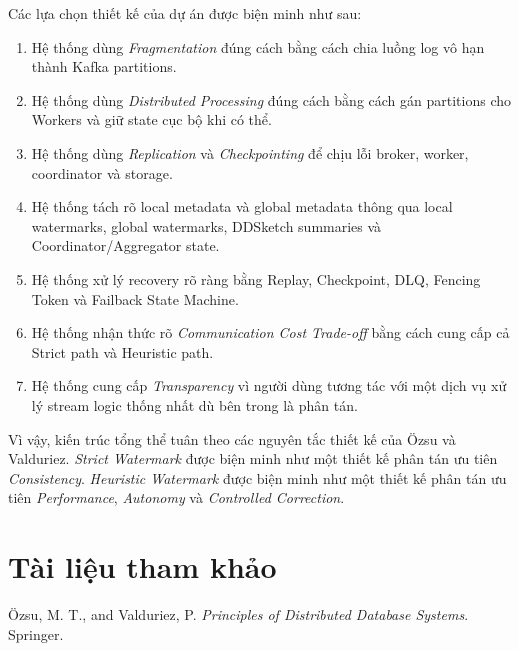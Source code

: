 \documentclass[12pt,a4paper]{article}
\begin{document}
Các lựa chọn thiết kế của dự án được biện minh như sau:

\begin{enumerate}
    \item Hệ thống dùng \textit{Fragmentation} đúng cách bằng cách chia luồng log vô hạn thành Kafka partitions.
    \item Hệ thống dùng \textit{Distributed Processing} đúng cách bằng cách gán partitions cho Workers và giữ state cục bộ khi có thể.
    \item Hệ thống dùng \textit{Replication} và \textit{Checkpointing} để chịu lỗi broker, worker, coordinator và storage.
    \item Hệ thống tách rõ local metadata và global metadata thông qua local watermarks, global watermarks, DDSketch summaries và Coordinator/Aggregator state.
    \item Hệ thống xử lý recovery rõ ràng bằng Replay, Checkpoint, DLQ, Fencing Token và Failback State Machine.
    \item Hệ thống nhận thức rõ \textit{Communication Cost Trade-off} bằng cách cung cấp cả Strict path và Heuristic path.
    \item Hệ thống cung cấp \textit{Transparency} vì người dùng tương tác với một dịch vụ xử lý stream logic thống nhất dù bên trong là phân tán.
\end{enumerate}

Vì vậy, kiến trúc tổng thể tuân theo các nguyên tắc thiết kế của Özsu và Valduriez. \textit{Strict Watermark} được biện minh như một thiết kế phân tán ưu tiên \textit{Consistency}. \textit{Heuristic Watermark} được biện minh như một thiết kế phân tán ưu tiên \textit{Performance}, \textit{Autonomy} và \textit{Controlled Correction}.

\section{Tài liệu tham khảo}

Özsu, M. T., and Valduriez, P. \textit{Principles of Distributed Database Systems}. Springer.
\end{document}
